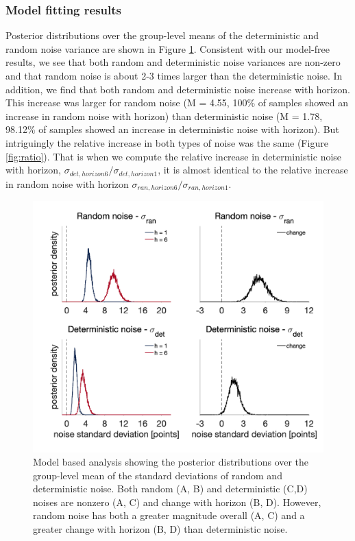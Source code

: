\documentclass[12pt]{article}
\begin{document}
	\subsubsection*{Model fitting results} 
	
	Posterior distributions over the group-level means of the deterministic and random noise variance are shown in Figure \ref{fig:mb1}. Consistent with our model-free results, we see that both random and deterministic noise variances are non-zero and that random noise is about 2-3 times larger than the deterministic noise. In addition, we find that both random and deterministic noise increase with horizon.  This increase was larger for random noise (M = 4.55, 100\% of samples showed an increase in random noise with horizon) than deterministic noise (M = 1.78, 98.12\% of samples showed an increase in deterministic noise with horizon). But intriguingly the relative increase in both types of noise was the same (Figure \ref{fig:ratio}). That is when we compute the relative increase in deterministic noise with horizon, $\sigma_{det, horizon6}/\sigma_{det, horizon1}$, it is almost identical to the relative increase in random noise with horizon $\sigma_{ran, horizon6}/\sigma_{ran, horizon1}$. 
	
	
	\begin{figure}[hp]
		\begin{center}
			\includegraphics[width=1\textwidth]{figures/hyperprior.png}
			\caption{Model based analysis showing the posterior distributions over the group-level mean of the standard deviations of  random and deterministic noise. Both random (A, B) and deterministic (C,D) noises are nonzero (A, C) and change with horizon (B, D).  However, random noise has both a greater magnitude overall (A, C) and a greater change with horizon (B, D) than deterministic noise.}
			\label{fig:mb1}
		\end{center}
	\end{figure}
	
\end{document}
